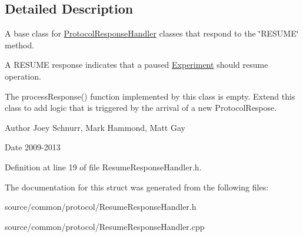 \subsection{Detailed Description}
A base class for \hyperlink{struct_picto_1_1_protocol_response_handler}{Protocol\-Response\-Handler} classes that respond to the \char`\"{}\-R\-E\-S\-U\-M\-E\char`\"{} method. 

A R\-E\-S\-U\-M\-E response indicates that a paused \hyperlink{class_picto_1_1_experiment}{Experiment} should resume operation.

The process\-Response() function implemented by this class is empty. Extend this class to add logic that is triggered by the arrival of a new Protocol\-Respose. \begin{DoxyAuthor}{Author}
Joey Schnurr, Mark Hammond, Matt Gay 
\end{DoxyAuthor}
\begin{DoxyDate}{Date}
2009-\/2013 
\end{DoxyDate}


Definition at line 19 of file Resume\-Response\-Handler.\-h.



The documentation for this struct was generated from the following files\-:\begin{DoxyCompactItemize}
\item 
source/common/protocol/Resume\-Response\-Handler.\-h\item 
source/common/protocol/Resume\-Response\-Handler.\-cpp\end{DoxyCompactItemize}

